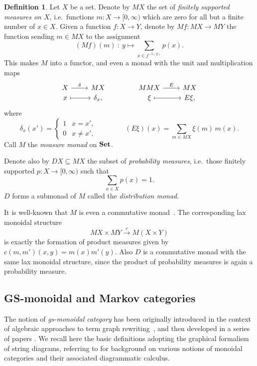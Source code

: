 \documentclass[a4paper,UKenglish,numberwithinsect,cleveref, autoref, thm-restate]{lipics-v2021}
\theoremstyle{plain} %
\theoremstyle{definition} %
\newtheorem{mydefinition}[mytheorem]{Definition}
\begin{document}
\begin{mydefinition}\label{monadM}
 Let $X$ be a set. Denote by $MX$ the set of \emph{finitely supported measures on $X$}, i.e.~functions $m:X\to[0,\infty)$ which are zero for all but a finite number of $x\in X$. 
 Given a function $f:X\to Y$, denote by $Mf:MX\to MY$ the function sending $m\in MX$ to the assignment
 \[
	 (Mf)(m) \: : \: y \longmapsto \sum_{x\in f^{-1(y)}} p(x) .
 \]
 This makes $M$ into a functor, and even a monad with the unit and multiplication maps
 \[
  \begin{tikzcd}[row sep=0]
   X \ar{r}{\delta} & MX \\
   x \ar[mapsto]{r} & \delta_x ,
  \end{tikzcd}
  \qquad\qquad
  \begin{tikzcd}[row sep=0]
   MMX \ar{r}{E} & MX \\
   \xi \ar[mapsto]{r} & E\xi ,
  \end{tikzcd}
 \]
 where 
 \[
  \delta_x(x') = \begin{cases}
                  1 & x=x' , \\
                  0 & x\ne x',
                 \end{cases}
 \qquad\qquad
 (E\xi)(x) = \sum_{m\in MX} \xi(m)\,m(x) .
 \]
 Call $M$ the \emph{measure monad} on $\mathbf{Set}$.

 Denote also by $DX\subseteq MX$ the subset of \emph{probability measures}, i.e.~those finitely supported $p:X\to[0,\infty)$ such that
 \[
  \sum_{x\in X} p(x) = 1 .
 \]
 $D$ forms a submonad of $M$ called the \emph{distribution monad}.
\end{mydefinition}

It is well-known that $M$ is even a commutative monad~\cite{coumans2013scalars}.
The corresponding lax monoidal structure
\[
	MX \times MY \stackrel{c}{\longrightarrow} M(X \times Y)
\]
is exactly the formation of product measures given by $c(m, m')(x, y) = m(x) m'(y)$.
Also $D$ is a commutative monad with the same lax monoidal structure, since the product of probability measures is again a probability measure.

\subsection{GS-monoidal and Markov categories}

The notion of \emph{gs-monoidal category} has been originally introduced in the context of algebraic approaches to term graph rewriting~\cite{CorradiniGadducci97}, and then
developed in a series of papers \cite{CorradiniGadducci99, CorradiniGadducci02, CorradiniGadducci99b}.
We recall here the basic definitions adopting the graphical formalism of string diagrams,
%
%
referring to \cite{Selinger2011} for background on various notions of monoidal categories and their associated diagrammatic calculus.
\end{document}
